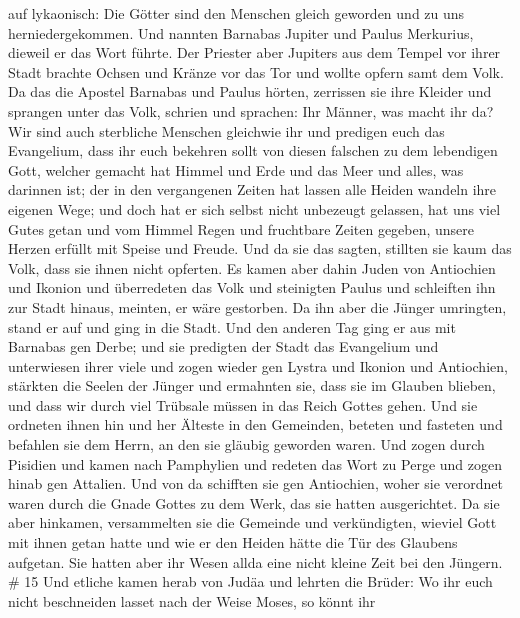 auf lykaonisch: Die Götter sind den Menschen gleich geworden und zu uns
herniedergekommen.  Und nannten Barnabas Jupiter und Paulus
Merkurius, dieweil er das Wort führte.  Der Priester aber
Jupiters aus dem Tempel vor ihrer Stadt brachte Ochsen und Kränze vor
das Tor und wollte opfern samt dem Volk.  Da das die
Apostel Barnabas und Paulus hörten, zerrissen sie ihre Kleider und
sprangen unter das Volk, schrien  und sprachen: Ihr Männer,
was macht ihr da? Wir sind auch sterbliche Menschen gleichwie ihr und
predigen euch das Evangelium, dass ihr euch bekehren sollt von diesen
falschen zu dem lebendigen Gott, welcher gemacht hat Himmel und Erde und
das Meer und alles, was darinnen ist;  der in den
vergangenen Zeiten hat lassen alle Heiden wandeln ihre eigenen Wege;
 und doch hat er sich selbst nicht unbezeugt gelassen, hat
uns viel Gutes getan und vom Himmel Regen und fruchtbare Zeiten gegeben,
unsere Herzen erfüllt mit Speise und Freude.  Und da sie
das sagten, stillten sie kaum das Volk, dass sie ihnen nicht opferten.
 Es kamen aber dahin Juden von Antiochien und Ikonion und
überredeten das Volk und steinigten Paulus und schleiften ihn zur Stadt
hinaus, meinten, er wäre gestorben.  Da ihn aber die Jünger
umringten, stand er auf und ging in die Stadt. Und den anderen Tag ging
er aus mit Barnabas gen Derbe;  und sie predigten der Stadt
das Evangelium und unterwiesen ihrer viele und zogen wieder gen Lystra
und Ikonion und Antiochien,  stärkten die Seelen der Jünger
und ermahnten sie, dass sie im Glauben blieben, und dass wir durch viel
Trübsale müssen in das Reich Gottes gehen.  Und sie
ordneten ihnen hin und her Älteste in den Gemeinden, beteten und
fasteten und befahlen sie dem Herrn, an den sie gläubig geworden waren.
 Und zogen durch Pisidien und kamen nach Pamphylien
 und redeten das Wort zu Perge und zogen hinab gen
Attalien.  Und von da schifften sie gen Antiochien, woher
sie verordnet waren durch die Gnade Gottes zu dem Werk, das sie hatten
ausgerichtet.  Da sie aber hinkamen, versammelten sie die
Gemeinde und verkündigten, wieviel Gott mit ihnen getan hatte und wie er
den Heiden hätte die Tür des Glaubens aufgetan.  Sie hatten
aber ihr Wesen allda eine nicht kleine Zeit bei den Jüngern. \# 15
 Und etliche kamen herab von Judäa und lehrten die Brüder:
Wo ihr euch nicht beschneiden lasset nach der Weise Moses, so könnt ihr
